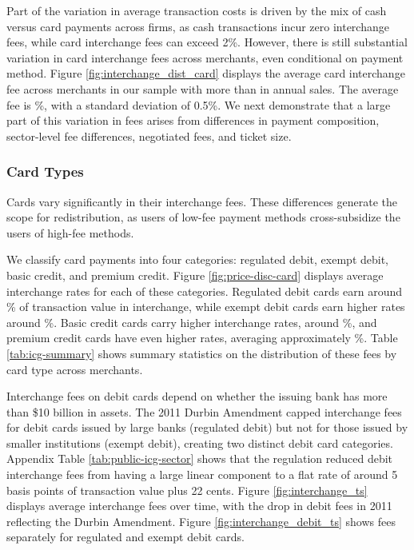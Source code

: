 \documentclass[main.tex]{subfiles}
\begin{document}
Part of the variation in average transaction costs is driven by the mix of cash versus card payments across firms, as cash transactions incur zero interchange fees, while card interchange fees can exceed 2\%.
However, there is still substantial variation in card interchange fees across merchants, even conditional on payment method.
Figure \ref{fig:interchange_dist_card} displays the average card interchange fee across merchants in our sample with more than \sizecutoff in annual sales.
The average fee is \%, with a standard deviation of 0.5\%.
We next demonstrate that a large part of this variation in fees arises from differences in payment composition, sector-level fee differences, negotiated fees, and ticket size.


\subsubsection{Card Types\label{subsec:card-types}}
Cards vary significantly in their interchange fees.
These differences generate the scope for redistribution, as users of low-fee payment methods cross-subsidize the users of high-fee methods.

We classify card payments into four categories: regulated debit, exempt debit, basic credit, and premium credit.
Figure \ref{fig:price-disc-card} displays average interchange rates for each of these categories.
Regulated debit cards earn around \% of transaction value in interchange, while exempt debit cards earn higher rates around \%.
Basic credit cards carry higher interchange rates, around \%, and premium credit cards have even higher rates, averaging approximately \%.
Table \ref{tab:icg-summary} shows summary statistics on the distribution of these fees by card type across merchants.

Interchange fees on debit cards depend on whether the issuing bank has more than \$10 billion in assets.
The 2011 Durbin Amendment capped interchange fees for debit cards issued by large banks (regulated debit) but not for those issued by smaller institutions (exempt debit), creating two distinct debit card categories.
Appendix Table \ref{tab:public-icg-sector} shows that the regulation reduced debit interchange fees from having a large linear component to a flat rate of around 5 basis points of transaction value plus 22 cents.
Figure \ref{fig:interchange_ts} displays average interchange fees over time, with the drop in debit fees in 2011 reflecting the Durbin Amendment.
Figure \ref{fig:interchange_debit_ts} shows fees separately for regulated and exempt debit cards.
\end{document}
